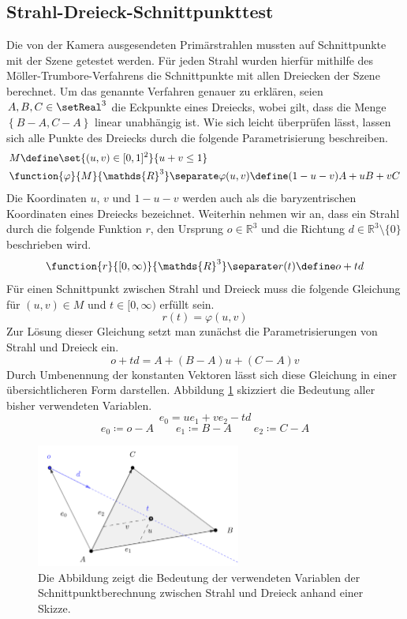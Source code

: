 \documentclass[crop=false]{standalone}
\begin{document}
    \subsection{Strahl-Dreieck-Schnittpunkttest} %
    \label{sub:strahl_dreieck_schnittpunkttest}
      Die von der Kamera ausgesendeten Primärstrahlen mussten auf Schnittpunkte mit der Szene getestet werden.
      Für jeden Strahl wurden hierfür mithilfe des Möller-Trumbore-Verfahrens die Schnittpunkte mit allen Dreiecken der Szene berechnet.
      Um das genannte Verfahren genauer zu erklären, seien $A,B,C\in \setReal^3$ die Eckpunkte eines Dreiecks, wobei gilt, dass die Menge $\left\{ B-A,C-A \right\}$ linear unabhängig ist.
      Wie sich leicht überprüfen lässt, lassen sich alle Punkte des Dreiecks durch die folgende Parametrisierung beschreiben.
      \begin{align*}
        &M \define \set{ (u,v)\in [0,1]^2 }{ u+v \leq 1 } \\
        &\function{\varphi}{M}{\mathds{R}^3}
        \separate
        \varphi(u,v)\define (1-u-v)A + uB + vC
      \end{align*}
      Die Koordinaten $u$, $v$ und $1-u-v$ werden auch als die baryzentrischen Koordinaten eines Dreiecks bezeichnet.
      Weiterhin nehmen wir an, dass ein Strahl durch die folgende Funktion $r$, den Ursprung $o\in\mathds{R}^3$ und die Richtung $d\in\mathds{R}^3\setminus\{0\}$ beschrieben wird.
      \[
        \function{r}{[0,\infty)}{\mathds{R}^3}
        \separate
        r(t) \define o + td
      \]
      Für einen Schnittpunkt zwischen Strahl und Dreieck muss die folgende Gleichung für $(u,v)\in M$ und $t\in[0,\infty)$ erfüllt sein.
      \[
        r(t) = φ(u,v)
      \]
      Zur Lösung dieser Gleichung setzt man zunächst die Parametrisierungen von Strahl und Dreieck ein.
      \[
        o + td = A + (B-A)u + (C-A)v
      \]
      Durch Umbenennung der konstanten Vektoren lässt sich diese Gleichung in einer übersichtlicheren Form darstellen.
      Abbildung \ref{fig:ray-triangle-intersection-scheme} skizziert die Bedeutung aller bisher verwendeten Variablen.
      \[
        e_0 = ue_1 + ve_2 - td
      \]
      \[
        e_0 \coloneqq o - A
        \qquad
        e_1 \coloneqq B-A
        \qquad
        e_2 \coloneqq C-A
      \]
      \begin{figure}[h]
        \center
        \includegraphics[width=0.6\textwidth]{images/ray_triangle_intersection_scheme.pdf}
        \caption{%
          Die Abbildung zeigt die Bedeutung der verwendeten Variablen der Schnittpunktberechnung zwischen Strahl und Dreieck anhand einer Skizze.
        }
        \label{fig:ray-triangle-intersection-scheme}
      \end{figure}
\end{document}
